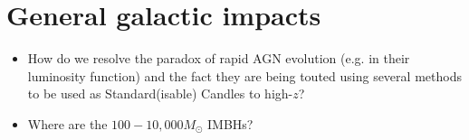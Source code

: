 \documentclass[11pt,a4paper]{article}
\begin{document}
\section*{General galactic impacts}
\begin{itemize}
\item How do we resolve the paradox of rapid AGN evolution (e.g. in their luminosity function) and the fact they are being touted using several methods to be used as Standard(isable) Candles to high-$z$?

\item  Where are the $100 - 10,000 M_{\odot}$ IMBHs?
\end{itemize}
\end{document}
